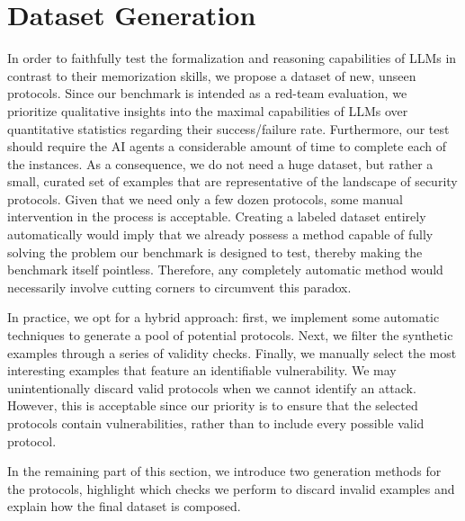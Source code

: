 \section{Dataset Generation}
\label{sec:datasetgeneration}
In order to faithfully test the formalization and reasoning capabilities of LLMs in contrast to their memorization skills, we propose a dataset of new, unseen protocols. Since our benchmark is intended as a red-team evaluation, we prioritize qualitative insights into the maximal capabilities of LLMs over quantitative statistics regarding their success/failure rate. Furthermore, our test should require the AI agents a considerable amount of time to complete each of the instances. As a consequence, we do not need a huge dataset, but rather a small, curated set of examples that are representative of the landscape of security protocols. Given that we need only a few dozen protocols, some manual intervention in the process is acceptable. Creating a labeled dataset entirely automatically would imply that we already possess a method capable of fully solving the problem our benchmark is designed to test, thereby making the benchmark itself pointless. Therefore, any completely automatic method would necessarily involve cutting corners to circumvent this paradox.

In practice, we opt for a hybrid approach: first, we implement some automatic techniques to generate a pool of potential protocols. Next, we filter the synthetic examples through a series of validity checks. Finally, we manually select the most interesting examples that feature an identifiable vulnerability. We may unintentionally discard valid protocols when we cannot identify an attack. However, this is acceptable since our priority is to ensure that the selected protocols contain vulnerabilities, rather than to include every possible valid protocol.

In the remaining part of this section, we introduce two generation methods for the protocols, highlight which checks we perform to discard invalid examples and explain how the final dataset is composed.

